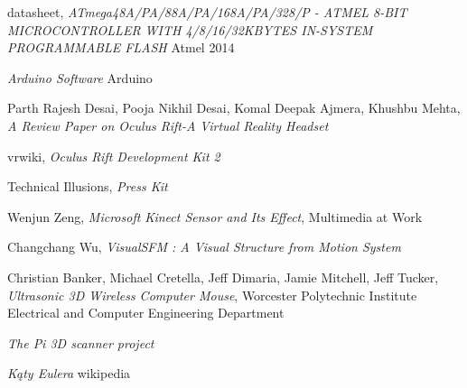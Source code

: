 \begin{thebibliography}{99}
   datasheet, \textit{ATmega48A/PA/88A/PA/168A/PA/328/P - 
  ATMEL 8-BIT MICROCONTROLLER WITH 4/8/16/32KBYTES IN-SYSTEM PROGRAMMABLE FLASH}
  Atmel 2014

   \textit{Arduino Software}
  Arduino

    Parth Rajesh Desai, Pooja Nikhil Desai, Komal Deepak Ajmera, Khushbu Mehta,
  \textit{A Review Paper on Oculus Rift-A Virtual Reality Headset}

    vrwiki,
  \textit{Oculus Rift Development Kit 2}
  
   Technical Illusions,
  \textit{Press Kit}

   Wenjun Zeng,
  \textit{Microsoft Kinect Sensor and Its Effect}, Multimedia at Work

   Changchang Wu,
  \textit{VisualSFM : A Visual Structure from Motion System}

    Christian Banker, Michael Cretella, Jeff Dimaria, Jamie Mitchell, Jeff Tucker, 
  \textit{Ultrasonic 3D Wireless Computer Mouse}, 
  Worcester Polytechnic Institute Electrical and Computer Engineering Department 

  \textit{The Pi 3D scanner project}

  \textit{Kąty Eulera} wikipedia
  
  
\end{thebibliography}
